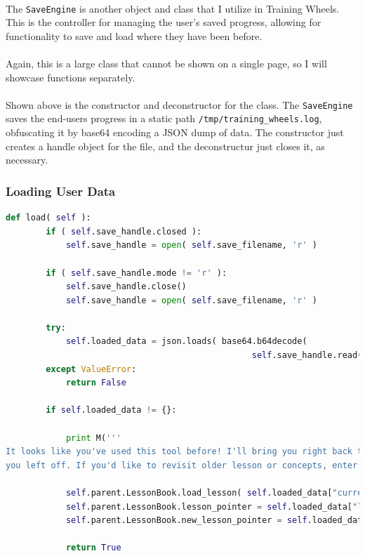 \documentclass[11pt]{article}
\begin{document}
	\paragraph{}

	\paragraph{} The \texttt{SaveEngine} is another object and class that I utilize in Training Wheels. This is the controller for managing the user's saved progress, allowing for functionality to save and load where they have been before.

	\paragraph{} Again, this is a large class that cannot be shown on a single page, so I will showcase functions separately. 

	\paragraph{} Shown above is the constructor and deconstructor for the class. The \texttt{SaveEngine} saves the end-users progress in a static path \texttt{/tmp/training\_wheels.log}, obfuscating it by base64 encoding a JSON dump of data. The constructor just creates a handle object for the file, and the deconstructur just closes it, as necessary.

	\newpage

	\subsubsection{Loading User Data}

\begin{lstlisting}[language=Python]
	def load( self ):
		if ( self.save_handle.closed ):
			self.save_handle = open( self.save_filename, 'r' )

		if ( self.save_handle.mode != 'r' ):
			self.save_handle.close()
			self.save_handle = open( self.save_filename, 'r' )

		try:
			self.loaded_data = json.loads( base64.b64decode( 
												 self.save_handle.read() ) )
		except ValueError:
			return False
			
		if self.loaded_data != {}:

			print M('''
It looks like you've used this tool before! I'll bring you right back to where 
you left off. If you'd like to revisit older lesson or concepts, enter `@help`!''')

			self.parent.LessonBook.load_lesson( self.loaded_data["current_lesson"] )
			self.parent.LessonBook.lesson_pointer = self.loaded_data["lesson_pointer"]
			self.parent.LessonBook.new_lesson_pointer = self.loaded_data["lesson_pointer"]

			return True

\end{lstlisting}
\end{document}
